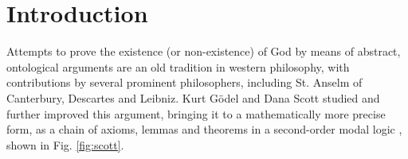 \documentclass{birkjour}
\theoremstyle{definition}
\theoremstyle{remark}
\numberwithin{equation}{section}
\begin{document}
\maketitle
\section{Introduction}

Attempts to prove the
existence (or non-existence) of God by means of abstract, ontological
arguments are an old tradition in western philosophy, with contributions by several prominent philosophers, including St. Anselm of
Canterbury, Descartes and Leibniz. Kurt G{\"o}del and Dana Scott studied and further improved this argument, bringing it to a mathematically more precise form, as a chain of axioms, lemmas and theorems in a second-order modal logic \cite{GoedelNotes,ScottNotes}, shown in Fig. \ref{fig:scott}.
\end{document}

